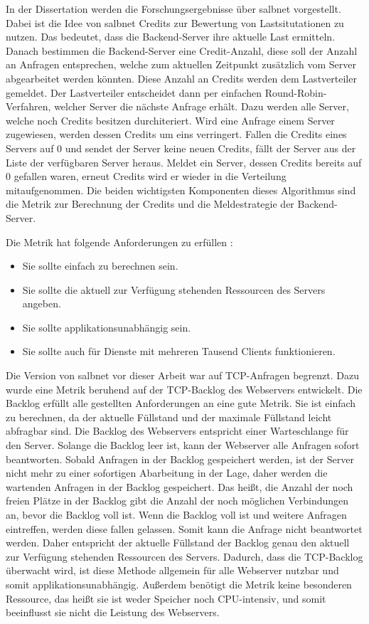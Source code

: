 \documentclass[a4paper, 12pt, BCOR10mm, DIV12, toc=bibliography, toc=listof, german]{scrbook}
\begin{document}
	In der Dissertation \cite{zinke2012} werden die Forschungsergebnisse über salbnet vorgestellt.
	Dabei ist die Idee von salbnet Credits zur Bewertung von Lastsitutationen zu nutzen. Das bedeutet,
	dass die Backend-Server ihre aktuelle Last ermitteln. Danach bestimmen die Backend-Server eine
	Credit-Anzahl, diese soll der Anzahl an Anfragen entsprechen, welche zum aktuellen Zeitpunkt
	zusätzlich vom Server abgearbeitet werden könnten. Diese Anzahl an Credits werden dem
	Lastverteiler gemeldet. Der Lastverteiler entscheidet dann per einfachen Round-Robin-Verfahren,
	welcher Server die nächste Anfrage erhält.  Dazu werden alle Server, welche noch Credits besitzen
	durchiteriert. Wird eine Anfrage einem Server zugewiesen, werden dessen Credits um eins
	verringert. Fallen die Credits eines Servers auf 0 und sendet der Server keine neuen Credits,
	fällt der Server aus der Liste der verfügbaren Server heraus. Meldet ein Server, dessen Credits
	bereits auf 0 gefallen waren, erneut Credits wird er wieder in die Verteilung mitaufgenommen. Die
	beiden wichtigsten Komponenten dieses Algorithmus sind die Metrik zur Berechnung der Credits und
	die Meldestrategie der Backend-Server.

	Die Metrik hat folgende Anforderungen zu erfüllen \cite{scsczile2008}:

	\begin{itemize}
		\item Sie sollte einfach zu berechnen sein.
		\item Sie sollte die aktuell zur Verfügung stehenden Ressourcen des Servers angeben.
		\item Sie sollte applikationsunabhängig sein.
		\item Sie sollte auch für Dienste mit mehreren Tausend Clients funktionieren.
	\end{itemize}

	Die Version von salbnet vor dieser Arbeit war auf TCP-Anfragen begrenzt. Dazu wurde eine Metrik
	beruhend auf der TCP-Backlog des Webservers entwickelt. Die Backlog erfüllt alle gestellten
	Anforderungen an eine gute Metrik. Sie ist einfach zu berechnen, da der aktuelle Füllstand und der
	maximale Füllstand leicht abfragbar sind. Die Backlog des Webservers entspricht einer
	Warteschlange für den Server. Solange die Backlog leer ist, kann der Webserver alle Anfragen sofort
	beantworten.  Sobald Anfragen in der Backlog gespeichert werden, ist der Server nicht mehr zu
	einer sofortigen Abarbeitung in der Lage, daher werden die wartenden Anfragen in der Backlog
	gespeichert. Das heißt, die Anzahl der noch freien Plätze in der Backlog gibt die Anzahl der noch
	möglichen Verbindungen an, bevor die Backlog voll ist. Wenn die Backlog voll ist und weitere
	Anfragen eintreffen, werden diese fallen gelassen. Somit kann die Anfrage nicht beantwortet
	werden.  Daher entspricht der aktuelle Füllstand der Backlog genau den aktuell zur Verfügung
	stehenden Ressourcen des Servers. Dadurch, dass die TCP-Backlog überwacht wird, ist diese Methode
	allgemein für alle Webserver nutzbar und somit applikationsunabhängig. Außerdem benötigt die
	Metrik keine besonderen Ressource, das heißt sie ist weder Speicher noch CPU-intensiv, und somit
	beeinflusst sie nicht die Leistung des Webservers. 
\end{document}
